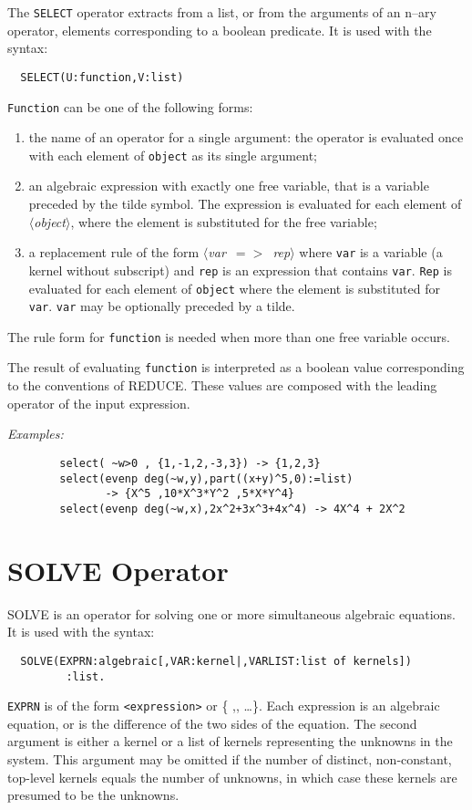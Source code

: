 \documentclass[11pt,letterpaper]{book}
\makeatletter
\newcommand{\REDUCE}{REDUCE}
\newcommand{\underscore}{\_}
\newcommand{\ttindex}[1]{{\renewcommand{\_}{\protect\underscore}%
                          \index{#1@{\tt #1}}}}
\newcommand{\meta}[1]{\mbox{$\langle$\it#1\/$\rangle$}}
\makeatother
\begin{document}
The {\tt SELECT} operator extracts from a list,
or from the arguments of an n--ary operator, elements corresponding
to a boolean predicate. It is used with the syntax:
{\small\begin{verbatim}
  SELECT(U:function,V:list)
\end{verbatim}}

{\tt Function} can be one of the following forms:
\begin{enumerate}
\item the name of an operator for a single argument: the operator
is evaluated once with each element of {\tt object} as its single argument;
\item an algebraic expression with exactly one free variable, that is
a variable preceded by the tilde symbol. The expression
is evaluated for each element of \meta{object}, where the element is
substituted for the free variable;
\item a replacement rule of the form \meta{var $=>$ rep}
where {\tt var} is a variable (a kernel without subscript)
and {\tt rep} is an expression that contains {\tt var}.
{\tt Rep} is evaluated for each element of {\tt object} where
the element is substituted for  {\tt var}. {\tt var} may be
optionally preceded by a tilde.
\end{enumerate}
The rule form  for {\tt function} is needed when more than
one free variable occurs.

The result of evaluating {\tt function} is
interpreted as a boolean value corresponding to the conventions of
{\REDUCE}. These values are composed with the leading operator of the
input expression.

{\it Examples:}
{\small\begin{verbatim}
        select( ~w>0 , {1,-1,2,-3,3}) -> {1,2,3}
        select(evenp deg(~w,y),part((x+y)^5,0):=list)
               -> {X^5 ,10*X^3*Y^2 ,5*X*Y^4}
        select(evenp deg(~w,x),2x^2+3x^3+4x^4) -> 4X^4 + 2X^2
\end{verbatim}}


\section{SOLVE Operator}\ttindex{SOLVE}
SOLVE is an operator for solving one or more simultaneous algebraic
equations. It is used with the syntax:
{\small\begin{verbatim}
  SOLVE(EXPRN:algebraic[,VAR:kernel|,VARLIST:list of kernels])
         :list.
\end{verbatim}}
{\tt EXPRN} is of the form {\tt <expression>} or
\{ {\tt <expression1>},{\tt <expression2>}, \dots \}.  Each expression is an
algebraic equation, or is the difference of the two sides of the equation.
The second argument is either a kernel or a list of kernels representing
the unknowns in the system.  This argument may be omitted if the number of
distinct, non-constant, top-level kernels equals the number of unknowns,
in which case these kernels are presumed to be the unknowns.
\end{document}
